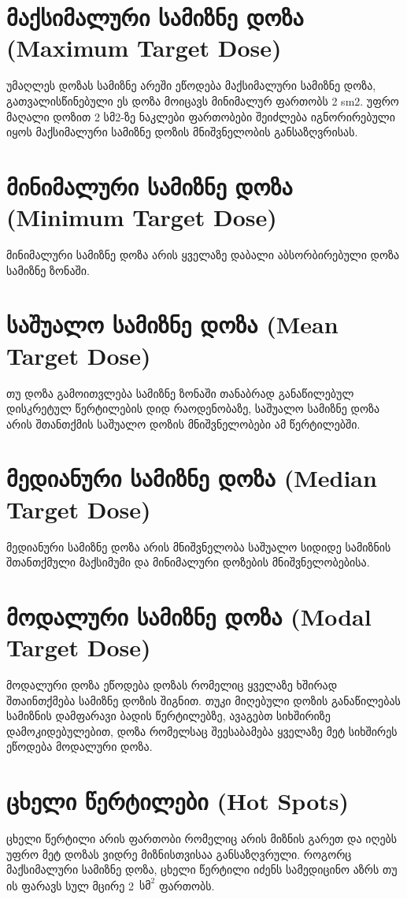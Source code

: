 \documentclass[12pt,a4paper,]{report}
\begin{document}
\section{მაქსიმალური სამიზნე დოზა (Maximum Target Dose)}
უმაღლეს დოზას სამიზნე არეში ეწოდება მაქსიმალური სამიზნე დოზა, გათვალისწინებული ეს დოზა მოიცავს მინიმალურ ფართობს 2 sm2. უფრო მაღალი დოზით 2 სმ2-ზე ნაკლები ფართობები შეიძლება იგნორირებული იყოს მაქსიმალური სამიზნე დოზის მნიშვნელობის განსაზღვრისას.

\section{მინიმალური სამიზნე დოზა (Minimum Target Dose)}
მინიმალური სამიზნე დოზა არის ყველაზე დაბალი აბსორბირებული დოზა სამიზნე ზონაში. 

\section{საშუალო სამიზნე დოზა (Mean Target Dose)}
თუ დოზა გამოითვლება სამიზნე ზონაში თანაბრად განაწილებულ დისკრეტულ წერტილების დიდ რაოდენობაზე, საშუალო სამიზნე დოზა არის შთანთქმის საშუალო დოზის მნიშვნელობები ამ წერტილებში. 

\section{მედიანური სამიზნე დოზა (Median Target Dose)}
მედიანური სამიზნე დოზა არის მნიშვნელობა საშუალო სიდიდე სამიზნის შთანთქმული მაქსიმუმი და მინიმალური დოზების მნიშვნელობებისა.

\section{მოდალური სამიზნე დოზა (Modal Target Dose)}
მოდალური დოზა ეწოდება დოზას რომელიც ყველაზე ხშირად შთაინთქმება სამიზნე დოზის შიგნით. თუკი მიღებული დოზის განაწილებას სამიზნის დამფარავი ბადის წერტილებზე, ავაგებთ სიხშირიზე დამოკიდებულებით, დოზა რომელსაც შეესაბამება ყველაზე მეტ სიხშირეს ეწოდება მოდალური დოზა.

\section{ცხელი წერტილები (Hot Spots)}
ცხელი წერტილი არის ფართობი რომელიც არის მიზნის გარეთ და იღებს უფრო მეტ დოზას ვიდრე მიზნისთვისაა განსაზღვრული. როგორც მაქსიმალური სამიზნე დოზა, ცხელი წერტილი იძენს სამედიცინო აზრს თუ ის ფარავს სულ მცირე 2~$\text{სმ}^2$ ფართობს.
\end{document}
